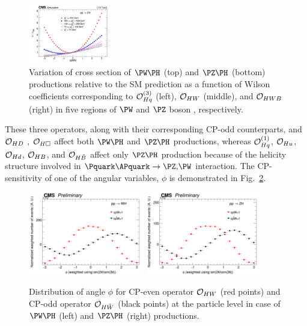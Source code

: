 \documentclass[a4paper,11pt]{article}
\begin{document}
\begin{figure}[hbtp]
\begin{center}
\includegraphics[width=0.321\textwidth]{Figures/LHE/ZH/Canv_cpWB.png}
\end{center}
\caption{
Variation of cross section of $\PW\PH$ (top) and $\PZ\PH$ (bottom) productions relative to the SM prediction as a function of Wilson coefficients corresponding to ${\cal O}^{(3)}_{Hq}$ (left), ${\cal O}_{HW}$ (middle), and ${\cal O}_{HWB}$ (right) in five regions of $\PW$ and $\PZ$ boson {\pt}, respectively.
}
\label{fig:LHE_WZH}
\end{figure}
These three operators, along with their corresponding CP-odd counterparts, and ${\cal O}_{HD}$ , ${\cal O}_{H\square}$  affect both $\PW\PH$ and $\PZ\PH$ productions, whereas ${\cal O}^{(1)}_{Hq}$, ${\cal O}_{Hu}$, ${\cal O}_{Hd}$, ${\cal O}_{HB}$, and ${\cal O}_{H\tilde{B}}$ affect only $\PZ\PH$ production 
because of the helicity structure involved in $\Pquark\APquark \to \PZ\text{,}\PW$ interaction.
The CP-sensitivity of one of the angular variables, $\phi$ is demonstrated in Fig.~\ref{fig:LHE_phi}.
\begin{figure}[hbtp]
\begin{center}
\includegraphics[width=0.45\textwidth]{Figures/LHE/WH/LHE_Plot_phi.png}
\includegraphics[width=0.45\textwidth]{Figures/LHE/ZH/LHE_Plot_phi.png}
\end{center}
\caption{
Distribution of angle $\phi$ for CP-even operator ${\cal O}_{HW}$  (red points) and CP-odd operator ${\cal O}_{H\tilde{W}}$ (black points) at the particle level in case of $\PW\PH$ (left) and $\PZ\PH$ (right) productions.
}
\label{fig:LHE_phi}
\end{figure}
\end{document}
